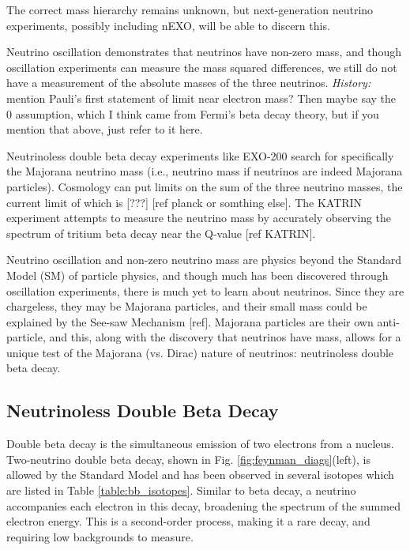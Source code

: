 \noindent
The correct mass hierarchy remains unknown, but next-generation neutrino experiments, possibly including nEXO, will be able to discern this.

Neutrino oscillation demonstrates that neutrinos have non-zero mass, and though oscillation experiments can measure the mass squared differences, we still do not have a measurement of the absolute masses of the three neutrinos.  {\color{gray}\emph{History:  }mention Pauli's first statement of limit near electron mass?  Then maybe say the 0 assumption, which I think came from Fermi's beta decay theory, but if you mention that above, just refer to it here.}

Neutrinoless double beta decay experiments like EXO-200 search for specifically the Majorana neutrino mass (i.e., neutrino mass if neutrinos are indeed Majorana particles).  Cosmology can put limits on the sum of the three neutrino masses, the current limit of which is [???] [ref planck or somthing else].  The KATRIN experiment attempts to measure the neutrino mass by accurately observing the spectrum of tritium beta decay near the Q-value [ref KATRIN].

Neutrino oscillation and non-zero neutrino mass are physics beyond the Standard Model (SM) of particle physics, and though much has been discovered through oscillation experiments, there is much yet to learn about neutrinos. Since they are chargeless, they may be Majorana particles, and their small mass could be explained by the See-saw Mechanism [ref]. Majorana particles are their own anti-particle, and this, along with the discovery that neutrinos have mass, allows for a unique test of the Majorana (vs. Dirac) nature of neutrinos: neutrinoless double beta decay.

\subsection{Neutrinoless Double Beta Decay}

Double beta decay is the simultaneous emission of two electrons from a nucleus.  Two-neutrino double beta decay, shown in Fig. \ref{fig:feynman_diags}(left), is allowed by the Standard Model and has been observed in several isotopes which are listed in Table \ref{table:bb_isotopes}.  Similar to beta decay, a neutrino accompanies each electron in this decay, broadening the spectrum of the summed electron energy. This is a second-order process, making it a rare decay, and requiring low backgrounds to measure.

